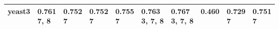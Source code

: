 \begin{tabular}{llllllllll}
yeast3                 &                    \makecell{0.761 \\ \scriptsize{7, 8}} &                 \makecell{0.752 \\ \scriptsize{7}} &     \makecell{0.752 \\ \scriptsize{7}} &        \makecell{0.755 \\ \scriptsize{7}} &        \makecell{0.763 \\ \scriptsize{3, 7, 8}} &     \makecell{0.767 \\ \scriptsize{3, 7, 8}} &      \makecell{0.460 \\ \scriptsize{}} &              \makecell{0.729 \\ \scriptsize{7}} &     \makecell{0.751 \\ \scriptsize{7}} \\
\bottomrule
\end{tabular}
